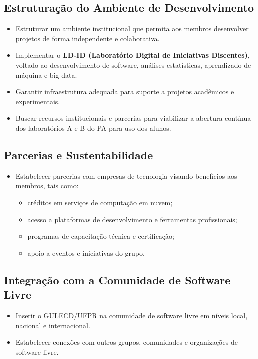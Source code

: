 \documentclass[11pt,a4paper]{article}
\begin{document}
\subsection{Estruturação do Ambiente de Desenvolvimento}

\begin{itemize}
    \item Estruturar um ambiente institucional que permita aos membros desenvolver projetos de forma independente e colaborativa.
    \item Implementar o \textbf{LD-ID (Laboratório Digital de Iniciativas Discentes)}, voltado ao desenvolvimento de software, análises estatísticas, aprendizado de máquina e big data.
    \item Garantir infraestrutura adequada para suporte a projetos acadêmicos e experimentais.
    \item Buscar recursos institucionais e parcerias para viabilizar a abertura contínua dos laboratórios A e B do PA para uso dos alunos.
\end{itemize}


\subsection{Parcerias e Sustentabilidade}

\begin{itemize}
    \item Estabelecer parcerias com empresas de tecnologia visando benefícios aos membros, tais como:
    \begin{itemize}
        \item créditos em serviços de computação em nuvem;
        \item acesso a plataformas de desenvolvimento e ferramentas profissionais;
        \item programas de capacitação técnica e certificação;
        \item apoio a eventos e iniciativas do grupo.
    \end{itemize}
\end{itemize}

\subsection{Integração com a Comunidade de Software Livre}

\begin{itemize}
    \item Inserir o GULECD/UFPR na comunidade de software livre em níveis local, nacional e internacional.
    \item Estabelecer conexões com outros grupos, comunidades e organizações de software livre.
\end{itemize}
\end{document}

